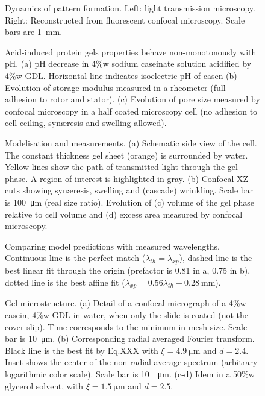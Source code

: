 \documentclass[twocolumn,superscriptaddress,showpacs,preprintnumbers,amsmath,amssymb,prl]{revtex4-1}
\begin{document}
\author{Mathieu Leocmach}

\begin{figure}
	
	\caption{Dynamics of pattern formation. Left: light transmission microscopy. Right: Reconstructed from fluorescent confocal microscopy. Scale bars are \SI{1}{\milli\metre}.}
	\label{fig:dynamics}
\end{figure}

\begin{figure}
	
	\caption{Acid-induced protein gels properties behave non-monotonously with pH. (a) pH decrease in 4\%w sodium caseinate solution acidified by 4\%w GDL. Horizontal line indicates isoelectric pH of casen (b) Evolution of storage modulus measured in a rheometer (full adhesion to rotor and stator). (c) Evolution of pore size measured by confocal microscopy in a half coated microscopy cell (no adhesion to cell ceiling, syn\ae{}resis and swelling allowed).}
	\label{fig:acidification}
\end{figure}

\begin{figure}
	
	\caption{Modelisation  and measurements. (a) Schematic side view of the cell. The constant thickness gel sheet (orange) is surrounded by water. Yellow lines show the path of transmitted light through the gel phase. A region of interest is highlighted in gray. (b) Confocal XZ cuts showing syn\ae{}resis, swelling and (cascade) wrinkling. Scale bar is \SI{100}{\micro\metre} (real size ratio). Evolution of (c) volume of the gel phase relative to cell volume and (d) excess area measured by confocal microscopy.}
	\label{fig:sideview}
\end{figure}

\begin{figure*}
	
	\caption{Comparing model predictions with measured wavelengths. Continuous line is the perfect match ($\lambda_{th}=\lambda_{xp}$), dashed line is the best linear fit through the origin (prefactor is 0.81 in a, 0.75 in b), dotted line is the best affine fit ($\lambda_{xp}=0.56\lambda_{th}+\SI{0.28}{\milli\metre}$).}
	\label{fig:DarcyPoiseuille}
\end{figure*}

\begin{figure}
	
	\caption{Gel microstructure. (a) Detail of a confocal micrograph of a 4\%w casein, 4\%w GDL in water, when only the slide is coated (not the cover slip). Time corresponds to the minimum in mesh size. Scale bar is \SI{10}{\micro\metre}. (b) Corresponding radial averaged Fourier transform. Black line is the best fit by Eq.XXX with $\xi=\SI{4.9}{\micro\metre}$ and $d=2.4$. Inset shows the center of the non radial average spectrum (arbitrary logarithmic color scale). Scale bar is \SI{10}{\per\micro\metre}. (c-d) Idem in a 50\%w glycerol solvent, with $\xi=\SI{1.5}{\micro\metre}$ and $d=2.5$.}
	\label{fig:mesh}
\end{figure}
\end{document}
